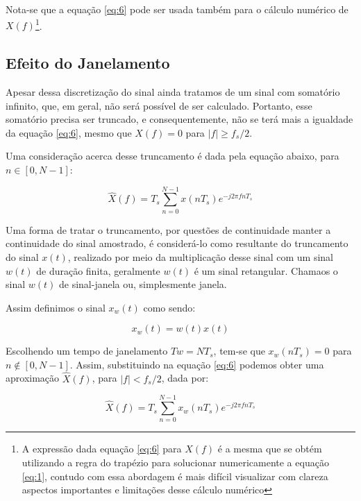 		
		Nota-se que a equação \eqref{eq:6} pode ser usada também para o cálculo numérico de $X(f)$\footnote{A expressão dada equação \eqref{eq:6} para $X(f)$ é a mesma que se obtém utilizando a regra do trapézio para solucionar numericamente a equação \eqref{eq:1}, contudo com essa abordagem é mais difícil visualizar com clareza aspectos importantes e limitações desse cálculo numérico}.
		
		
	\subsection{Efeito do Janelamento}
	\label{secao-janelamento}
		
		Apesar dessa discretização do sinal ainda tratamos de um sinal com somatório infinito, que, em geral, não será possível de ser calculado. Portanto, esse somatório precisa ser truncado, e consequentemente, não se terá mais a igualdade da equação \eqref{eq:6}, mesmo que $X(f) = 0$ para $|f| \ge f_s/2$.
		
		Uma consideração acerca desse truncamento é dada pela equação abaixo, para $n\in [0,N-1]$:
		
		\begin{equation}
			\label{eq:7}
			\hat{X}(f) = T_s\sum_{n=0}^{N-1}x(nT_s)e^{-j2\pi fnT_s}
		\end{equation}
		
		
		Uma forma de tratar o truncamento, por questões de continuidade manter a continuidade do sinal amostrado, é considerá-lo como resultante do truncamento do sinal $x(t)$, realizado por meio da multiplicação desse sinal com um sinal $w(t)$ de duração finita, geralmente $w(t)$ é um sinal retangular. Chamaos o sinal $w(t)$ de sinal-janela ou, simplesmente janela.
		
		Assim definimos o sinal $x_w(t)$ como sendo:
		
		\begin{equation}
			\label{eq:8}
			x_w(t) = w(t)x(t)
		\end{equation}
		
		Escolhendo um tempo de janelamento $Tw = NT_s$, tem-se que $x_w(nT_s) = 0$ para $n \notin [0,N-1]$. Assim, substituindo na equação \eqref{eq:6} podemos obter uma aproximação $\hat{X}(f)$, para $|f|<f_s/2$, dada por:
		
		\begin{equation}
			\label{eq:9}
			\hat{X}(f) = T_s \sum_{n=0}^{N-1}x_w(nT_s)e^{-j2\pi fnT_s}
		\end{equation}
		
